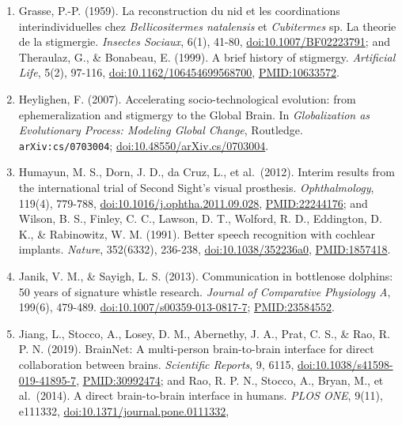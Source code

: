 \documentclass[10pt,letterpaper]{article}
\begin{document}
\begin{enumerate}
  dictyostelid social amoebas. \emph{Nature Communications}, 7, 12085.
  \href{https://doi.org/10.1038/ncomms12085}{doi:10.1038/ncomms12085};
  \url{PMID:27357338}.
\item
  Grasse, P.-P. (1959). La reconstruction du nid et les coordinations
  interindividuelles chez \emph{Bellicositermes natalensis} et
  \emph{Cubitermes} sp. La theorie de la stigmergie. \emph{Insectes
  Sociaux}, 6(1), 41-80,
  \href{https://doi.org/10.1007/BF02223791}{doi:10.1007/BF02223791}; and
  Theraulaz, G., \& Bonabeau, E. (1999). A brief history of stigmergy.
  \emph{Artificial Life}, 5(2), 97-116,
  \href{https://doi.org/10.1162/106454699568700}{doi:10.1162/106454699568700},
  \url{PMID:10633572}.
\item
  Heylighen, F. (2007). Accelerating socio-technological evolution: from
  ephemeralization and stigmergy to the Global Brain. In
  \emph{Globalization as Evolutionary Process: Modeling Global Change},
  Routledge. \texttt{arXiv:cs/\allowbreak{}0703004};
  \href{https://doi.org/10.48550/arXiv.cs/0703004}{doi:10.48550/arXiv.cs/0703004}.
\item
  Humayun, M. S., Dorn, J. D., da Cruz, L., et al.~(2012). Interim
  results from the international trial of Second Sight's visual
  prosthesis. \emph{Ophthalmology}, 119(4), 779-788,
  \href{https://doi.org/10.1016/j.ophtha.2011.09.028}{doi:10.1016/j.ophtha.2011.09.028},
  \url{PMID:22244176}; and Wilson, B. S., Finley, C. C., Lawson, D. T.,
  Wolford, R. D., Eddington, D. K., \& Rabinowitz, W. M. (1991). Better
  speech recognition with cochlear implants. \emph{Nature}, 352(6332),
  236-238,
  \href{https://doi.org/10.1038/352236a0}{doi:10.1038/352236a0},
  \url{PMID:1857418}.
\item
  Janik, V. M., \& Sayigh, L. S. (2013). Communication in bottlenose
  dolphins: 50 years of signature whistle research. \emph{Journal of
  Comparative Physiology A}, 199(6), 479-489.
  \href{https://doi.org/10.1007/s00359-013-0817-7}{doi:10.1007/s00359-013-0817-7};
  \url{PMID:23584552}.
\item
  Jiang, L., Stocco, A., Losey, D. M., Abernethy, J. A., Prat, C. S., \&
  Rao, R. P. N. (2019). BrainNet: A multi-person brain-to-brain
  interface for direct collaboration between brains. \emph{Scientific
  Reports}, 9, 6115,
  \href{https://doi.org/10.1038/s41598-019-41895-7}{doi:10.1038/s41598-019-41895-7},
  \url{PMID:30992474}; and Rao, R. P. N., Stocco, A., Bryan, M., et
  al.~(2014). A direct brain-to-brain interface in humans. \emph{PLOS
  ONE}, 9(11), e111332,
  \href{https://doi.org/10.1371/journal.pone.0111332}{doi:10.1371/journal.pone.0111332},

\end{enumerate}
\end{document}
